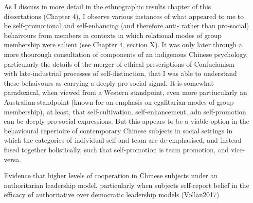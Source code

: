 {  As I discuss in more detail in the ethnographic results chapter of this dissertations (Chapter 4), I observe various instances of what appeared to me to be self-promotional and self-enhancing (and therefore anti- rather than pro-social) behaivours from members in contexts in which relational modes of group membership were salient (see Chapter 4, section X).  It was only later through a more thourough consultation of components of an indigenous Chinese psychology, particularly the details of the merger of ethical prescriptions of Confucianism with late-industrial processes of self-distinction, that I was able to understand these behaivours as carrying a deeply pro-social signal.  It is somewhat paradoxical, when viewed from a Western standpoint, even more partiucularly an Australian standpoint (known for an emphasis on egalitarian modes of group membership), at least, that self-cultivation, self-enhancement, adn self-promotion can be deeply pro-social expressions.  But this appears to be a viable option in the behavioural repertoire of contemporary Chinese subjects in social settings in which the categories of individual self and team are de-emphasised, and instead fused together holistically, such that self-promotion is team promotion, and vice-versa.

  Evidence that higher levels of cooperation in Chinese subjects under an authoritarian leadership model, particularly when subjects self-report belief in the efficacy of authoritative over democratic leadership models (Vollan2017)





















}
